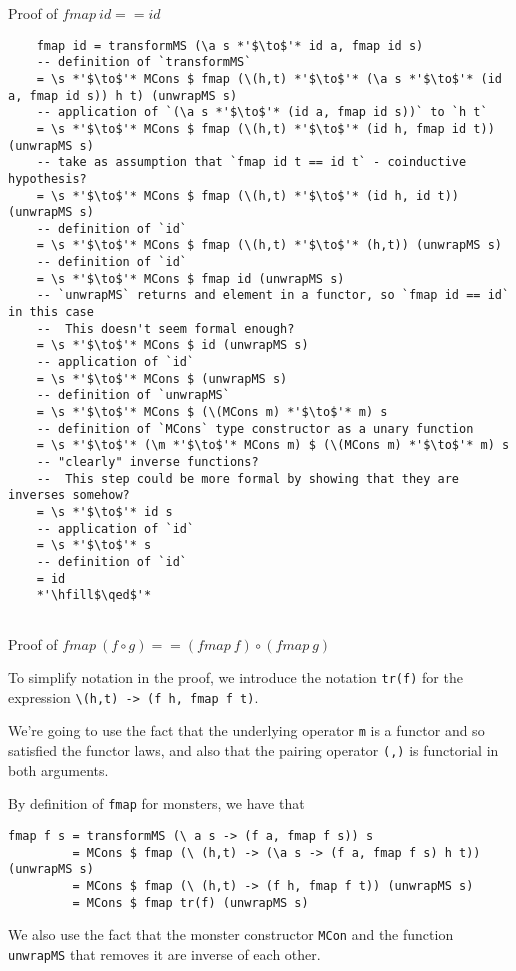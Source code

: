 \documentclass{article}
\begin{document}
Proof of $fmap\ id == id$\\

\begin{lstlisting}
	fmap id = transformMS (\a s *'$\to$'* id a, fmap id s)
	-- definition of `transformMS`
	= \s *'$\to$'* MCons $ fmap (\(h,t) *'$\to$'* (\a s *'$\to$'* (id a, fmap id s)) h t) (unwrapMS s)
	-- application of `(\a s *'$\to$'* (id a, fmap id s))` to `h t`
	= \s *'$\to$'* MCons $ fmap (\(h,t) *'$\to$'* (id h, fmap id t)) (unwrapMS s)
	-- take as assumption that `fmap id t == id t` - coinductive hypothesis?
	= \s *'$\to$'* MCons $ fmap (\(h,t) *'$\to$'* (id h, id t)) (unwrapMS s)
	-- definition of `id`
	= \s *'$\to$'* MCons $ fmap (\(h,t) *'$\to$'* (h,t)) (unwrapMS s)
	-- definition of `id`
	= \s *'$\to$'* MCons $ fmap id (unwrapMS s)
	-- `unwrapMS` returns and element in a functor, so `fmap id == id` in this case 
	--  This doesn't seem formal enough?
	= \s *'$\to$'* MCons $ id (unwrapMS s)
	-- application of `id`
	= \s *'$\to$'* MCons $ (unwrapMS s)
	-- definition of `unwrapMS`
	= \s *'$\to$'* MCons $ (\(MCons m) *'$\to$'* m) s
	-- definition of `MCons` type constructor as a unary function
	= \s *'$\to$'* (\m *'$\to$'* MCons m) $ (\(MCons m) *'$\to$'* m) s
	-- "clearly" inverse functions?
	--  This step could be more formal by showing that they are inverses somehow?
	= \s *'$\to$'* id s 
	-- application of `id`
	= \s *'$\to$'* s
	-- definition of `id`
	= id
	*'\hfill$\qed$'*
	
\end{lstlisting}
Proof of $fmap\ (f \circ g) == (fmap\ f) \circ (fmap\ g) $

To simplify notation in the proof, we introduce the notation \verb+tr(f)+ for the expression \verb+\(h,t) -> (f h, fmap f t)+.

We're going to use the fact that the underlying operator \verb+m+ is a functor and so satisfied the functor laws, and also that the pairing operator \verb+(,)+ is functorial in both arguments.

By definition of \verb+fmap+ for monsters, we have that
\begin{lstlisting}
fmap f s = transformMS (\ a s -> (f a, fmap f s)) s
         = MCons $ fmap (\ (h,t) -> (\a s -> (f a, fmap f s) h t)) (unwrapMS s)
         = MCons $ fmap (\ (h,t) -> (f h, fmap f t)) (unwrapMS s)
         = MCons $ fmap tr(f) (unwrapMS s)
\end{lstlisting}


We also use the fact that the monster constructor \verb+MCon+ and the function \verb+unwrapMS+ that removes it are inverse of each other.
\end{document}
